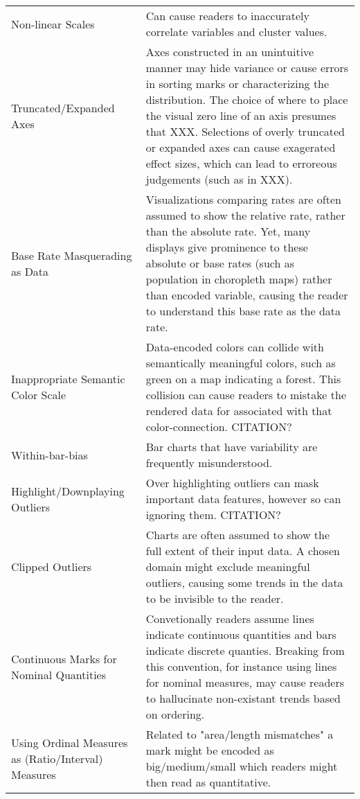 \begin{longtable}{p{3cm}p{14cm}}
 \rowcolor{colorc-opaque}Non-linear Scales & Can cause readers to inaccurately correlate variables and cluster values. \cite{pandey2015deceptive}\\
 \rowcolor{colorc}Truncated/Expanded Axes & Axes constructed in an unintuitive manner may hide variance or cause errors in sorting marks or characterizing the distribution.  The choice of where to place the visual zero line of an axis presumes that XXX. Selections of overly truncated or expanded axes can cause exagerated effect sizes, which can lead to erroreous judgements (such as in XXX).  \cite{pandey2015deceptive, correll2017black, cleveland1982variables, ritchie2019lie, correll2019truncating}\\
 \rowcolor{colorc-opaque}Base Rate Masquerading as Data  & Visualizations comparing rates are often assumed to show the relative rate, rather than the absolute rate. Yet, many displays give prominence to these absolute or base rates (such as population in choropleth maps) rather than encoded variable, causing the reader to understand this base rate as the data rate.  \cite{correll2016surprise}\\
 \rowcolor{colorc}Inappropriate Semantic Color Scale  & Data-encoded colors can collide with semantically meaningful colors, such as green on a map indicating a forest. This collision can cause readers to mistake the rendered data for associated with that color-connection. CITATION?\\
 \rowcolor{colorc-opaque}Within-bar-bias & Bar charts that have variability are frequently misunderstood. \cite{newman2012bar}\\
 \rowcolor{colorc}Highlight/Downplaying Outliers & Over highlighting outliers can mask important data features, however so can ignoring them. CITATION?\\
 \rowcolor{colorc-opaque}Clipped Outliers  & Charts are often assumed to show the full extent of their input data. A chosen domain might exclude meaningful outliers, causing some trends in the data to be invisible to the reader. \\
 \rowcolor{colorc}Continuous Marks for Nominal Quantities  & Convetionally readers assume lines indicate continuous quantities and bars indicate discrete quanties. Breaking from this convention, for instance using lines for nominal measures, may cause readers to hallucinate non-existant trends based on ordering.  \cite{mcnuttlinting, zacks1999bars}\\
 \rowcolor{colorc-opaque}Using Ordinal Measures as (Ratio/Interval) Measures & Related to "area/length mismatches" a mark might be encoded as big/medium/small which readers might then read as quantitative. \cite{stevens1946theory, few2019loom}\\

\end{longtable}
